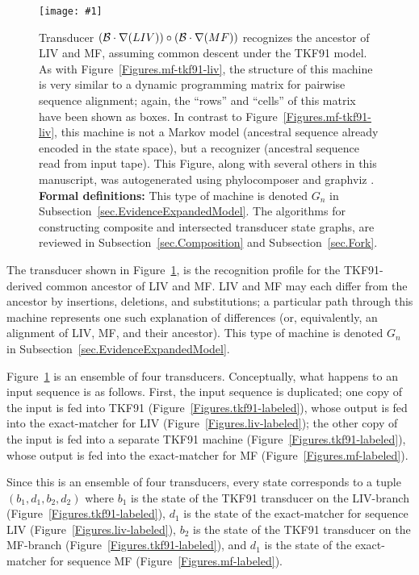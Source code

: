 \documentclass{article}
\newcommand{\secref}[1]{Subsection~\ref{sec.#1}}
\newcommand{\figref}[1]{Figure~\ref{Figures.#1}}
\newcommand{\figlabel}[1]{\label{Figures.#1}}
\newcommand{\easyfig}[4]{
\begin{figure}
\texttt{[image: \#1]}
\caption{ \figlabel{#3} #4}
\end{figure}}
\newcommand{\widepdffig}[2]{\easyfig{#1-fig.pdf}{width=\textwidth}{#1}{#2}}
\newcommand\tkf{{\cal B}}
\newcommand\formaldefs{{\bf Formal definitions: }}
\newcommand\fork{\circ}
\newcommand\recognize{\nabla}
\begin{document}
\widepdffig{fork-tkf91liv-tkf91mf}{Transducer $(\tkf \cdot \recognize(LIV))\fork(\tkf \cdot \recognize(MF))$ recognizes the ancestor of LIV and MF, assuming common descent under the TKF91 model.  
As with \figref{mf-tkf91-liv}, the structure of this machine is very similar to a dynamic programming matrix for pairwise sequence alignment; again, the ``rows'' and ``cells'' of this matrix have been shown as boxes.
In contrast to \figref{mf-tkf91-liv}, this machine is not a Markov model (ancestral sequence already encoded in the state space), but a recognizer (ancestral sequence read from input tape).
This Figure, along with several others in this manuscript, was autogenerated using phylocomposer \cite{BradleyHolmes2007} and graphviz \cite{GraphViz}.
\formaldefs
This type of machine is denoted $G_n$ in \secref{EvidenceExpandedModel}.
The algorithms for constructing composite and intersected transducer state graphs, are reviewed in \secref{Composition} and \secref{Fork}.
} 

The transducer shown in \figref{fork-tkf91liv-tkf91mf}, is the recognition profile for the TKF91-derived common ancestor of LIV and MF.
LIV and MF may each differ from the ancestor by insertions, deletions, and substitutions;
 a particular path through this machine represents one such explanation of differences
 (or, equivalently, an alignment of LIV, MF, and their ancestor).  
This type of machine is denoted $G_n$ in \secref{EvidenceExpandedModel}.

\figref{fork-tkf91liv-tkf91mf} is an ensemble of four transducers.
Conceptually, what happens to an input sequence is as follows.
First, the input sequence is duplicated;
one copy of the input is fed into TKF91 (\figref{tkf91-labeled}),
whose output is fed into the exact-matcher for LIV (\figref{liv-labeled});
the other copy of the input is fed into a separate TKF91 machine (\figref{tkf91-labeled}),
whose output is fed into the exact-matcher for MF (\figref{mf-labeled}).

Since this is an ensemble of four transducers, every state corresponds to a tuple $(b_1,d_1,b_2,d_2)$
where
$b_1$ is the state of the TKF91 transducer on the LIV-branch (\figref{tkf91-labeled}),
$d_1$ is the state of the exact-matcher for sequence LIV (\figref{liv-labeled}),
$b_2$ is the state of the TKF91 transducer on the MF-branch (\figref{tkf91-labeled}),
and $d_1$ is the state of the exact-matcher for sequence MF (\figref{mf-labeled}).
\end{document}
